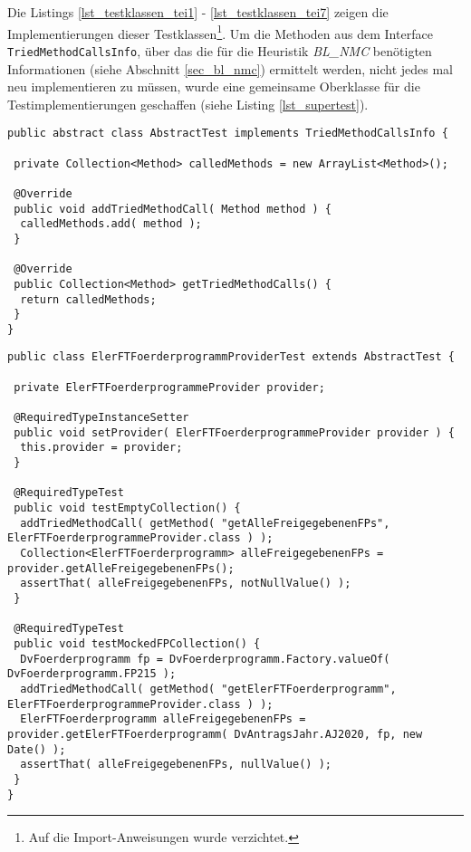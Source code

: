 Die Listings \ref{lst_testklassen_tei1} - \ref{lst_testklassen_tei7} zeigen die Implementierungen dieser Testklassen\footnote{Auf die Import-Anweisungen wurde verzichtet.}. Um die Methoden aus dem \Gls{Interface} \texttt{TriedMethodCallsInfo}, über das die für die \Gls{Heuristik} \emph{BL\_NMC} benötigten Informationen (siehe Abschnitt \ref{sec_bl_nmc}) ermittelt werden, nicht jedes mal neu implementieren zu müssen, wurde eine gemeinsame Oberklasse für die Testimplementierungen geschaffen (siehe Listing \ref{lst_supertest}).
\pagebreak
\begin{lstlisting}[style = java, caption = Oberklasse für die Testklassen, captionpos = b, label = lst_supertest]
public abstract class AbstractTest implements TriedMethodCallsInfo {

 private Collection<Method> calledMethods = new ArrayList<Method>();

 @Override
 public void addTriedMethodCall( Method method ) {
  calledMethods.add( method );
 }

 @Override
 public Collection<Method> getTriedMethodCalls() {
  return calledMethods;
 }
}
\end{lstlisting}
\pagebreak
\begin{lstlisting}[style = java, caption = Interface ElerFTFoerderprogrammProviderTest, captionpos = b, label = lst_testklassen_tei1]
public class ElerFTFoerderprogrammProviderTest extends AbstractTest {

 private ElerFTFoerderprogrammeProvider provider;
  
 @RequiredTypeInstanceSetter
 public void setProvider( ElerFTFoerderprogrammeProvider provider ) {
  this.provider = provider;
 }

 @RequiredTypeTest
 public void testEmptyCollection() {
  addTriedMethodCall( getMethod( "getAlleFreigegebenenFPs", ElerFTFoerderprogrammeProvider.class ) );
  Collection<ElerFTFoerderprogramm> alleFreigegebenenFPs = provider.getAlleFreigegebenenFPs();
  assertThat( alleFreigegebenenFPs, notNullValue() );
 }

 @RequiredTypeTest
 public void testMockedFPCollection() {
  DvFoerderprogramm fp = DvFoerderprogramm.Factory.valueOf( DvFoerderprogramm.FP215 );
  addTriedMethodCall( getMethod( "getElerFTFoerderprogramm", ElerFTFoerderprogrammeProvider.class ) );
  ElerFTFoerderprogramm alleFreigegebenenFPs = provider.getElerFTFoerderprogramm( DvAntragsJahr.AJ2020, fp, new Date() );
  assertThat( alleFreigegebenenFPs, nullValue() );
 }
}
\end{lstlisting}
\pagebreak
